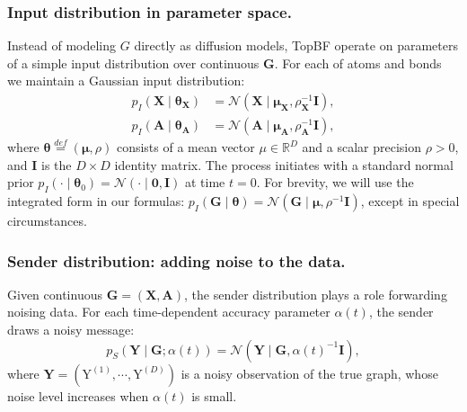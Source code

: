 \documentclass[journal,twoside,web]{ieeecolor}
\begin{document}
\subsubsection{Input distribution in parameter space.} %
Instead of modeling $G$ directly as diffusion models, TopBF operate on parameters of a simple input distribution over continuous $\mathbf{G}$. For each of atoms and bonds we maintain a Gaussian input distribution:
\begin{align}
    p_I(\mathbf{X} \mid \boldsymbol{\theta}_\mathbf{X}) &= \mathcal{N}(\mathbf{X} \mid \boldsymbol{\mu}_\mathbf{X}, \rho_\mathbf{X}^{-1}\boldsymbol{I}), \\
    p_I(\mathbf{A} \mid \boldsymbol{\theta}_\mathbf{A}) &= \mathcal{N}(\mathbf{A} \mid \boldsymbol{\mu}_\mathbf{A}, \rho_\mathbf{A}^{-1}\boldsymbol{I}),
\end{align}
where $\boldsymbol{\theta} \overset{def}{=} (\boldsymbol{\mu}, \rho)$ consists of a mean vector $\mu \in \mathbb{R}^D$ and a scalar precision $\rho > 0$, and $\boldsymbol{I}$ is the $D \times D$ identity matrix. The process initiates with a standard normal prior $p_I(\cdot \mid \boldsymbol{\theta}_0) = \mathcal{N}(\cdot \mid \boldsymbol{0}, \boldsymbol{I})$ at time $t=0$. 
For brevity, we will use the integrated form in our formulas: $p_I(\mathbf{G} \mid \boldsymbol{\theta}) = \mathcal{N}(\mathbf{G} \mid \boldsymbol{\mu}, \rho^{-1}\boldsymbol{I})$, except in special circumstances. 

\subsubsection{Sender distribution: adding noise to the data.}
Given continuous $\mathbf{G}=(\mathbf{X}, \mathbf{A})$, the sender distribution plays a role forwarding noising data. For each time-dependent accuracy parameter $\alpha(t)$, the sender draws a noisy message:
\begin{equation}
    p_S(\mathbf{Y} \mid \mathbf{G}; \alpha(t)) = \mathcal{N}(\mathbf{Y} \mid \mathbf{G}, \alpha(t)^{-1}\boldsymbol{I}),
\label{eq:sender}
\end{equation}
where $\mathbf{Y} = (\mathrm{Y}^{(1)}, \cdots, \mathrm{Y}^{(D)})$ is a noisy observation of the true graph, whose noise level increases when $\alpha(t)$ is small.
\end{document}
